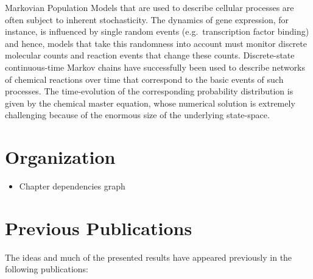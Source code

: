
Markovian Population Models that are used to describe cellular processes are often subject to inherent stochasticity.
The dynamics of gene expression, for instance, is influenced by 
single random events (e.g.\ transcription factor binding) and 
hence, models that take this randomness into account must monitor
discrete molecular counts and reaction events that change these counts.
Discrete-state continuous-time Markov chains have successfully  been
used to describe  networks of chemical reactions
over time that correspond to the basic events of such processes. 
The time-evolution of the corresponding probability distribution is 
given by the chemical master equation, whose numerical solution is
extremely challenging because of the enormous size of the underlying
state-space. 

\section{Organization}
\begin{itemize}
	\item Chapter dependencies graph
\end{itemize}


\section*{Previous Publications}%
The ideas and much of the presented results have appeared previously in the following publications:


\begin{refsection}[ownpubs]
    \small
    \nocite{*} %

    \printbibliography[heading=none]
\end{refsection}


